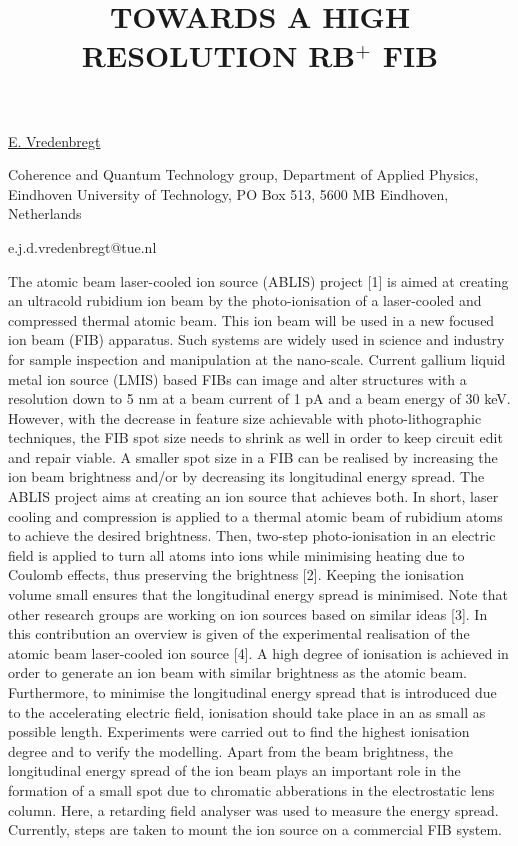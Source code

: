 \title{TOWARDS A HIGH RESOLUTION RB$^+$ FIB}

\underline{E. Vredenbregt} 

{\normalsize{\vspace{-4mm}
Coherence and Quantum Technology group,
Department of Applied Physics,
Eindhoven University of Technology,
PO Box 513, 5600 MB Eindhoven,
Netherlands

\email e.j.d.vredenbregt@tue.nl}}

The atomic beam laser-cooled ion source (ABLIS) project [1] is aimed at creating an ultracold rubidium ion beam by the photo-ionisation of a laser-cooled and compressed thermal atomic beam. This ion beam will be used in a new focused ion beam (FIB) apparatus. Such systems are widely used in science and industry for sample inspection and manipulation at the nano-scale. Current gallium liquid metal ion source (LMIS) based FIBs can image and alter structures with a resolution down to 5 nm at a beam current of 1 pA and a beam energy of 30 keV. However, with the decrease in feature size achievable with photo-lithographic techniques, the FIB spot size needs to shrink as well in order to keep circuit edit and repair viable. A smaller spot size in a FIB can be realised by increasing the ion beam brightness and/or by decreasing its longitudinal energy spread. The ABLIS project aims at creating an ion source that achieves both. In short, laser cooling and compression is applied to a thermal atomic beam of rubidium atoms to achieve the desired brightness. Then, two-step photo-ionisation in an electric field is applied to turn all atoms into ions while minimising heating due to Coulomb effects, thus preserving the brightness [2]. Keeping the ionisation volume small ensures that the longitudinal energy spread is minimised. Note that other research groups are working on ion sources based on similar ideas [3]. In this contribution an overview is given of the experimental realisation of the atomic beam laser-cooled ion source [4]. A high degree of ionisation is achieved in order to generate an ion beam with similar brightness as the atomic beam. Furthermore, to minimise the longitudinal energy spread that is introduced due to the accelerating electric field, ionisation should take place in an as small as possible length. Experiments were carried out to find the highest ionisation degree and to verify the modelling. Apart from the beam brightness, the longitudinal energy spread of the ion beam plays an important role in the formation of a small spot due to chromatic abberations in the electrostatic lens column. Here, a retarding field analyser was used to measure the energy spread. Currently, steps are taken to mount the ion source on a commercial FIB system.

